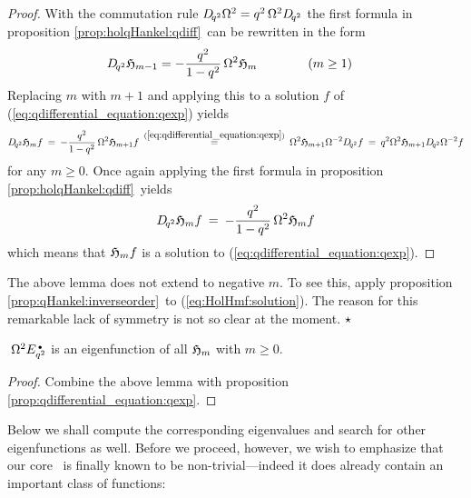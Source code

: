 \begin{proof}
With the commutation rule\/ $D_{\!q^2} \Omega^2 = q^2 \, \Omega^2 D_{\!q^2}$
the first formula in proposition \ref{prop:holqHankel:qdiff}\ can be
rewritten in the form
\begin{equation}\label{eq:holqHankel:qdiff:rewritten:bis}
    D_{\!q^2} \mathfrak{H}_{m-1} = -\frac{q^2}{1-q^2}\, \Omega^2 \mathfrak{H}_{m}
    \hspace{4em}  (m\geq 1)  \hspace{1em}
\end{equation}
Replacing $m$ with $m+1$ and applying this to a solution $f$ of
(\ref{eq:qdifferential_equation:qexp}) yields
$$  D_{\!q^2} \mathfrak{H}_{m} f
     \:=\: -\frac{q^2}{1-q^2}\, \Omega^2 \mathfrak{H}_{m+1} f
     \:\stackrel{(\ref{eq:qdifferential_equation:qexp})}{=}\:
             \Omega^2 \mathfrak{H}_{m+1} \Omega^{-2} D_{\!q^2} f
     \:=\: q^2 \Omega^2 \mathfrak{H}_{m+1} D_{\!q^2} \Omega^{-2} f $$
for any $m\geq 0$. Once again applying the first formula in
proposition \ref{prop:holqHankel:qdiff}\ yields
\begin{equation}\label{eq:HolHmf:solution}
   D_{\!q^2} \mathfrak{H}_{m} f  \:=\: -\frac{q^2}{1-q^2}\, \Omega^2 \mathfrak{H}_{m} f
\end{equation}
which means that $\mathfrak{H}_{m}f$ is a solution to (\ref{eq:qdifferential_equation:qexp}).
\end{proof}



\begin{remark} \rm
The above lemma does not extend to negative $m$. To see this,
apply proposition \ref{prop:qHankel:inverseorder}\ to (\ref{eq:HolHmf:solution}).
The reason for this remarkable lack of symmetry is not so clear at the moment.
$\hfill \star$
\end{remark}

\begin{prop} \label{prop:qqE:eigenfunction_qHankel}
$\;\Omega^2 E_{q^2}^{\scriptscriptstyle \, \bullet}$ is an eigenfunction of all\/ $\mathfrak{H}_{m}$ with\/ $m\geq 0$.
\end{prop}

\begin{proof}
Combine the above lemma with proposition \ref{prop:qdifferential_equation:qexp}\@.
\end{proof}
\vspace{2ex}


Below we shall compute the corresponding eigenvalues and search for other
eigenfunctions as well. Before we proceed, however, we wish to emphasize that
our core \Hcore\ is finally known to be non-trivial---indeed it does already contain
an important class of functions:



